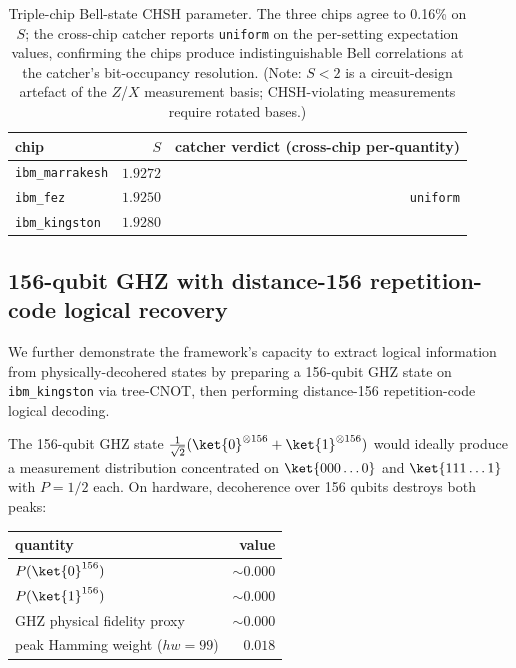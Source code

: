 \documentclass[11pt,a4paper]{article}
\begin{document}
\begin{table}[h]
\centering
\begin{tabular}{lrr}
\toprule
chip & $S$ & catcher verdict (cross-chip per-quantity) \\
\midrule
\texttt{ibm\_marrakesh} & $1.9272$ & \multirow{3}{*}{\texttt{uniform}}\\
\texttt{ibm\_fez}       & $1.9250$ & \\
\texttt{ibm\_kingston}  & $1.9280$ & \\
\bottomrule
\end{tabular}
\caption{Triple-chip Bell-state CHSH parameter. The three chips agree to 0.16\% on $S$; the cross-chip catcher reports \texttt{uniform} on the per-setting expectation values, confirming the chips produce indistinguishable Bell correlations at the catcher's bit-occupancy resolution. (Note: $S < 2$ is a circuit-design artefact of the $Z$/$X$ measurement basis; CHSH-violating measurements require rotated bases.)}\label{tab:bell}
\end{table}

\subsection{156-qubit GHZ with distance-156 repetition-code logical recovery}\label{ssec:ghz156}

We further demonstrate the framework's capacity to extract logical information from physically-decohered states by preparing a 156-qubit GHZ state on \texttt{ibm\_kingston} via tree-CNOT, then performing distance-156 repetition-code logical decoding.

The 156-qubit GHZ state $\frac{1}{\sqrt 2}(\ket{0}^{\otimes 156} + \ket{1}^{\otimes 156})$ would ideally produce a measurement distribution concentrated on $\ket{000\ldots0}$ and $\ket{111\ldots1}$ with $P=1/2$ each. On hardware, decoherence over 156 qubits destroys both peaks:

\begin{center}
\begin{tabular}{lr}
\toprule
quantity & value \\
\midrule
$P(\ket{0}^{156})$            & $\sim 0.000$ \\
$P(\ket{1}^{156})$            & $\sim 0.000$ \\
GHZ physical fidelity proxy    & $\sim 0.000$ \\
peak Hamming weight ($hw=99$)  & $0.018$ \\
\bottomrule
\end{tabular}
\end{center}
\end{document}
